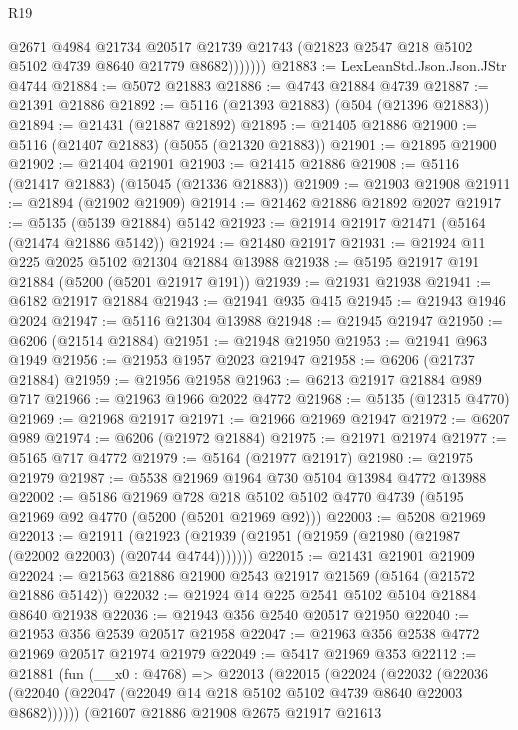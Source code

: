 \begin{lexlean}{R19}
\begin{coremodule}
{{{{{{{{{{{                @2671
                @4984
                @21734
                @20517
                @21739
                @21743
                (@21823 @2547 @218 @5102 @5102 @4739 @8640 @21779 @8682)))))))
@21883 := LexLeanStd.Json.Json.JStr @4744
@21884 := @5072 @21883
@21886 := @4743 @21884 @4739
@21887 := @21391 @21886
@21892 := @5116 (@21393 @21883) (@504 (@21396 @21883))
@21894 := @21431 (@21887 @21892)
@21895 := @21405 @21886
@21900 := @5116 (@21407 @21883) (@5055 (@21320 @21883))
@21901 := @21895 @21900
@21902 := @21404 @21901
@21903 := @21415 @21886
@21908 := @5116 (@21417 @21883) (@15045 (@21336 @21883))
@21909 := @21903 @21908
@21911 := @21894 (@21902 @21909)
@21914 := @21462 @21886 @21892 @2027
@21917 := @5135 (@5139 @21884) @5142
@21923 := @21914 @21917 @21471 (@5164 (@21474 @21886 @5142))
@21924 := @21480 @21917
@21931 := @21924 @11 @225 @2025 @5102 @21304 @21884 @13988
@21938 := @5195 @21917 @191 @21884 (@5200 (@5201 @21917 @191))
@21939 := @21931 @21938
@21941 := @6182 @21917 @21884
@21943 := @21941 @935 @415
@21945 := @21943 @1946 @2024
@21947 := @5116 @21304 @13988
@21948 := @21945 @21947
@21950 := @6206 (@21514 @21884)
@21951 := @21948 @21950
@21953 := @21941 @963 @1949
@21956 := @21953 @1957 @2023 @21947
@21958 := @6206 (@21737 @21884)
@21959 := @21956 @21958
@21963 := @6213 @21917 @21884 @989 @717
@21966 := @21963 @1966 @2022 @4772
@21968 := @5135 (@12315 @4770)
@21969 := @21968 @21917
@21971 := @21966 @21969 @21947
@21972 := @6207 @989
@21974 := @6206 (@21972 @21884)
@21975 := @21971 @21974
@21977 := @5165 @717 @4772
@21979 := @5164 (@21977 @21917)
@21980 := @21975 @21979
@21987 := @5538 @21969 @1964 @730 @5104 @13984 @4772 @13988
@22002 := @5186
    @21969
    @728
    @218
    @5102
    @5102
    @4770
    @4739
    (@5195 @21969 @92 @4770 (@5200 (@5201 @21969 @92)))
@22003 := @5208 @21969
@22013 := @21911
    (@21923 (@21939 (@21951 (@21959 (@21980 (@21987 (@22002 @22003) (@20744 @4744)))))))
@22015 := @21431 @21901 @21909
@22024 := @21563 @21886 @21900 @2543 @21917 @21569 (@5164 (@21572 @21886 @5142))
@22032 := @21924 @14 @225 @2541 @5102 @5104 @21884 @8640 @21938
@22036 := @21943 @356 @2540 @20517 @21950
@22040 := @21953 @356 @2539 @20517 @21958
@22047 := @21963 @356 @2538 @4772 @21969 @20517 @21974 @21979
@22049 := @5417 @21969 @353
@22112 := @21881
    (fun (__x0 : @4768) =>
    @22013
      (@22015
        (@22024
          (@22032
            (@22036 (@22040 (@22047 (@22049 @14 @218 @5102 @5102 @4739 @8640 @22003 @8682))))))
        (@21607
          @21886
          @21908
          @2675
          @21917
          @21613
}}}}}}}}}}}
\end{coremodule}
\end{lexlean}
